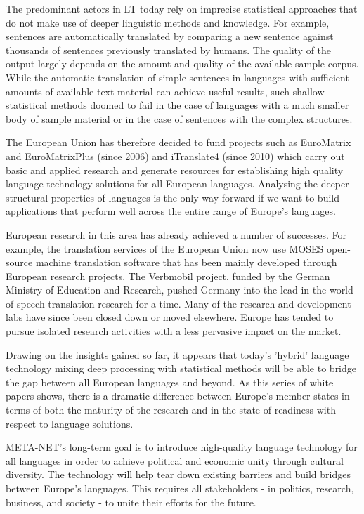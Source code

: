 \begin{multicols}{2}
The predominant actors in LT today rely on imprecise statistical approaches that do not make use of deeper linguistic methods and knowledge. For example, sentences are automatically translated by comparing a new sentence against thousands of sentences previously translated by humans. The quality of the output largely depends on the amount and quality of the available sample corpus. While the automatic translation of simple sentences in languages with sufficient amounts  of available text material can achieve useful results, such shallow statistical methods doomed to fail in the case of languages with a much smaller body of sample material or in the case of sentences with the complex structures.


The European Union has therefore decided to fund projects such as EuroMatrix and EuroMatrixPlus (since 2006) and iTranslate4 (since 2010) which carry out basic and applied research and generate resources for establishing high quality language technology solutions for all European languages. Analysing the deeper structural properties of languages is the only way forward if we want to build applications that perform well across the entire range of Europe’s languages.

European research in this area has already achieved a number of successes. For example, the translation services of the European Union now use MOSES open-source machine translation software that has been mainly developed through European research projects. The Verbmobil project, funded by the German Ministry of Education and Research, pushed Germany into the lead in the world of speech translation research for a time. Many of the research and development labs have since been closed down or moved elsewhere. Europe has tended to pursue isolated research activities with a less pervasive impact on the market.  


Drawing on the insights gained so far, it appears that today’s 'hybrid' language technology mixing deep processing with statistical methods will be able to bridge the gap between all European languages and beyond. As this series of white papers shows, there is a dramatic difference between Europe’s member states in terms of both the maturity of the research and in the state of readiness with respect to language solutions. 

META-NET’s long-term goal is to introduce high-quality language technology for all languages in order to achieve political and economic unity through cultural diversity. The technology will help tear down existing barriers and build bridges between Europe’s languages. This requires all stakeholders - in politics, research, business, and society - to unite their efforts for the future.


\end{multicols}
